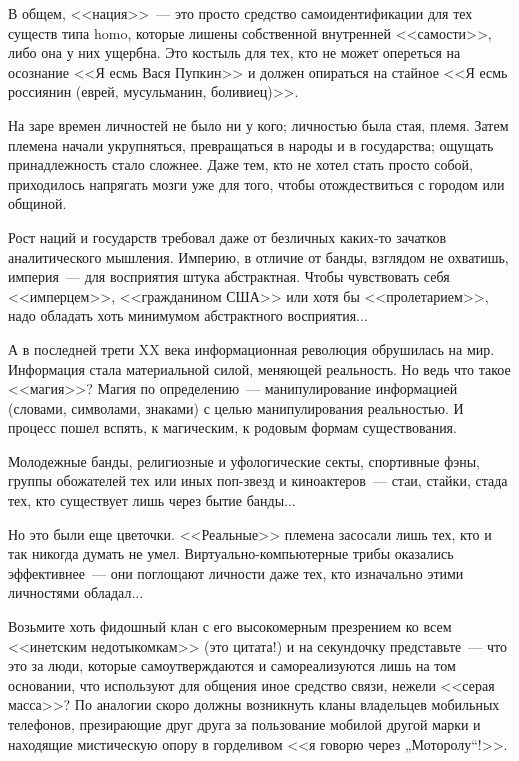 \documentclass{scrbook}
\newcommand{\flqq}{<<}
\newcommand{\frqq}{>>}
\newcommand{\mdash}{~--- }
\begin{document}
В общем, {\flqq}нация{\frqq}{\mdash}это просто средство самоидентификации для тех существ типа homo, которые лишены собственной внутренней {\flqq}самости{\frqq}, либо она у них ущербна. Это костыль для тех, кто не может опереться на осознание {\flqq}Я есмь Вася Пупкин{\frqq} и должен опираться на стайное {\flqq}Я есмь россиянин (еврей, мусульманин, боливиец){\frqq}.

На заре времен личностей не было ни у кого; личностью была стая, племя. Затем племена начали укрупняться, превращаться в народы и в государства; ощущать принадлежность стало сложнее. Даже тем, кто не хотел стать просто собой, приходилось напрягать мозги уже для того, чтобы отождествиться с городом или общиной.

Рост наций и государств требовал даже от безличных каких-то зачатков аналитического мышления. Империю, в отличие от банды, взглядом не охватишь, империя{\mdash}для восприятия штука абстрактная. Чтобы чувствовать себя {\flqq}имперцем{\frqq}, {\flqq}гражданином США{\frqq} или хотя бы {\flqq}пролетарием{\frqq}, надо обладать хоть минимумом абстрактного восприятия...

А в последней трети XX века информационная революция обрушилась на мир. Информация стала материальной силой, меняющей реальность. Но ведь что такое {\flqq}магия{\frqq}? Магия по определению{\mdash}манипулирование информацией (словами, символами, знаками) с целью манипулирования реальностью. И процесс пошел вспять, к магическим, к родовым формам существования.

Молодежные банды, религиозные и уфологические секты, спортивные фэны, группы обожателей тех или иных поп-звезд и киноактеров{\mdash}стаи, стайки, стада тех, кто существует лишь через бытие банды...

Но это были еще цветочки. {\flqq}Реальные{\frqq} племена засосали лишь тех, кто и так никогда думать не умел. Виртуально-компьютерные трибы оказались эффективнее{\mdash}они поглощают личности даже тех, кто изначально этими личностями обладал...

Возьмите хоть фидошный клан с его высокомерным презрением ко всем {\flqq}инетским недотыкомкам{\frqq} (это цитата!) и на секундочку представьте{\mdash}что это за люди, которые самоутверждаются и самореализуются лишь на том основании, что используют для общения иное средство связи, нежели {\flqq}серая масса{\frqq}? По аналогии скоро должны возникнуть кланы владельцев мобильных телефонов, презирающие друг друга за пользование мобилой другой марки и находящие мистическую опору в горделивом {\flqq}я говорю через „Моторолу“!{\frqq}.
\end{document}
